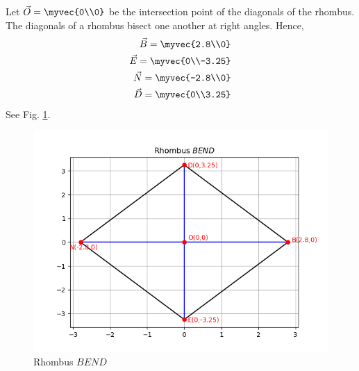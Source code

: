 Let $\vec{O} = \myvec{0\\0}$ be the intersection point of the diagonals of the rhombus. 
The diagonals of a rhombus bisect one another at right angles. Hence, 
\begin{align}
    \vec{B} = \myvec{2.8\\0}\\
    \vec{E} = \myvec{0\\-3.25}\\
    \vec{N} = \myvec{-2.8\\0}\\
    \vec{D} = \myvec{0\\3.25}
\end{align}
See Fig. \ref{rhombus/aug/2/6}.
\begin{figure}[!ht]
 \centering
 \includegraphics[width=\columnwidth]{solutions/aug/2/6/rhombus_BEND.png}
 \caption{Rhombus $BEND$}
 \label{rhombus/aug/2/6}
 \end{figure}



